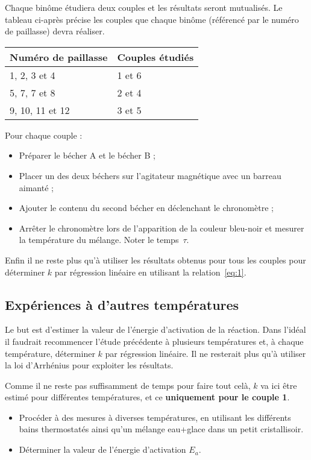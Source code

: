 \documentclass{tp}
\begin{document}
Chaque binôme étudiera deux couples et les résultats seront mutualisés. Le tableau ci-après précise les couples que chaque binôme (référencé par le numéro de paillasse) devra réaliser.
\begin{center}
  \begin{tabular}{ll}
    \toprule
    Numéro de paillasse & Couples étudiés \\
    \midrule
    1, 2, 3 et 4 & 1 et 6\\
    5, 7, 7 et 8 & 2 et 4\\
    9, 10, 11 et 12 & 3 et 5\\
    \bottomrule
  \end{tabular}
\end{center}
Pour chaque couple :
\begin{itemize}
  \item Préparer le bécher A et le bécher B ;
  \item Placer un des deux béchers sur l'agitateur magnétique avec un barreau aimanté ;
  \item Ajouter le contenu du second bécher en déclenchant le chronomètre ;
  \item Arrêter le chronomètre lors de l'apparition de la couleur bleu-noir et mesurer la température du mélange. Noter le temps~$\tau$.
\end{itemize}

Enfin il ne reste plus qu'à utiliser les résultats obtenus pour tous les couples pour déterminer $k$ par régression linéaire en utilisant la relation~\eqref{eq:1}.

\subsection{Expériences à d'autres températures}%
\label{sub:experiences_a_d_autres_temperatures}
Le but est d'estimer la valeur de l'énergie d'activation de la réaction. Dans l'idéal il faudrait recommencer l'étude précédente à plusieurs températures et, à chaque température, déterminer $k$ par régression linéaire. Il ne resterait plus qu'à utiliser la loi d'Arrhénius pour exploiter les résultats.

Comme il ne reste pas suffisamment de temps pour faire tout celà, $k$ va ici être estimé pour différentes températures, et ce \textbf{uniquement pour le couple 1}.

\begin{itemize}
  \item Procéder à des mesures à diverses températures, en utilisant les différents bains thermostatés ainsi qu'un mélange eau+glace dans un petit cristallisoir.

  \item Déterminer la valeur de l'énergie d'activation $E_a$. 
\end{itemize}
\end{document}
